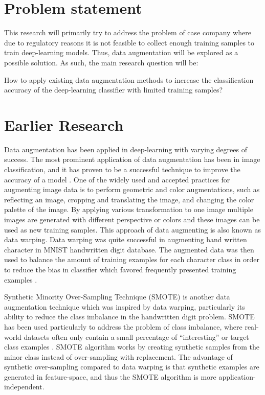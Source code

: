 \documentclass[12pt,a4paper,oneside,pdftex]{report}
\begin{document}
	
	\section{Problem statement}
	
	This research will primarily try to address the problem of case company where due to regulatory reasons it is not feasible to collect enough training samples to train deep-learning models. Thus, data augmentation will be explored as a possible solution. As such, the main research question will be:
	
	How to apply existing data augmentation methods to increase the classification accuracy of the deep-learning classifier with limited training samples?
	
	\section{Earlier Research}
	
	Data augmentation has been applied in deep-learning with varying degrees of success. The most prominent application of data augmentation has been in image classification, and it has proven to be a successful technique to improve the accuracy of a model \citep{krizhevsky2012imagenet}. One of the widely used and accepted practices for augmenting image data is to perform geometric and color augmentations, such as reflecting an image, cropping and translating the image, and changing the color palette of the image. By applying various transformation to one image multiple images are generated with different perspective or colors and these images can be used as new training samples. This approach of data augmenting is also known as data warping. Data warping was quite successful in augmenting hand written character in MNIST handwritten digit database. The augmented data was then used to balance the amount of training examples for each character class in order to reduce the bias in classifier which favored frequently presented training examples \citep{wong2016understanding}.
	
	Synthetic Minority Over-Sampling Technique (SMOTE) is another data augmentation technique which was inspired by data warping, particularly its ability to reduce the class imbalance in the handwritten digit problem. SMOTE has been used particularly to address the problem of class imbalance, where real-world datasets often only contain a small percentage of “interesting” or target class examples \citep{chawla2002smote}. SMOTE algorithm works by creating synthetic samples from the minor class instead of over-sampling with replacement. The advantage of synthetic over-sampling compared to data warping is that synthetic examples are generated in feature-space, and thus the SMOTE algorithm is more application-independent. 
	
\end{document}
